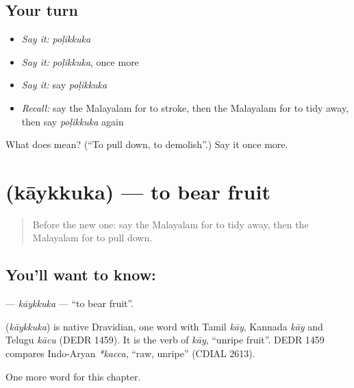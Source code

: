 \subsection*{Your turn}
\begin{itemize}
\raggedright
  \item \emph{Say it:} \emph{poḷikkuka}
  \item \emph{Say it:} \emph{poḷikkuka}, once more
  \item \emph{Say it:} say \emph{poḷikkuka}
  \item \emph{Recall:} say the Malayalam for to stroke, then the Malayalam for to tidy away, then say \emph{poḷikkuka} again
\end{itemize}

\begin{tcolorbox}[breakable,colback=teal!4,colframe=teal!35!black,title={Before you move on}]
What does  mean? (\textquotedblleft{}To pull down, to demolish\textquotedblright{}.) Say it once more.
\end{tcolorbox}
\section[\texorpdfstring{\ml{കായ്ക്കുക} (kāykkuka)}{കായ്ക്കുക (kāykkuka)}]{ (kāykkuka) — to bear fruit}

\label{lesson:ML-C311-kaykkuka}



\begin{quote}
Before the new one: say the Malayalam for to tidy away, then the Malayalam for to pull down.
\end{quote}

\subsection*{You'll want to know: }
\textbf{} — \emph{kāykkuka} — \textquotedblleft{}to bear fruit\textquotedblright{}.

\begin{cousinweb}
\textbf{} (\emph{kāykkuka}) is native Dravidian, one word with Tamil \emph{kāy}, Kannada \emph{kāy} and Telugu \emph{kācu} (DEDR 1459). It is the verb of \emph{kāy}, \textquotedblleft{}unripe fruit\textquotedblright{}. DEDR 1459 compares Indo-Aryan \emph{*kacca}, \textquotedblleft{}raw, unripe\textquotedblright{} (CDIAL 2613).
\end{cousinweb}

\begin{grammarlens}[title={What you've built}]
One more word for this chapter.
\end{grammarlens}

